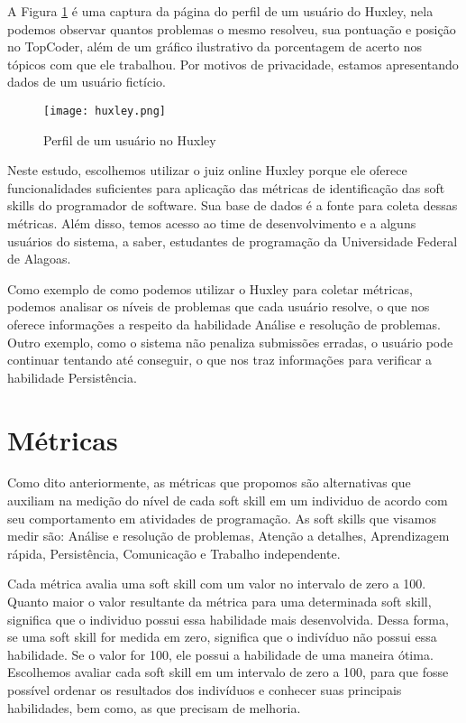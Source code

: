 A Figura \ref{fig:huxley} é uma captura da página do perfil de um usuário do Huxley, nela podemos observar quantos problemas o mesmo resolveu, sua pontuação e posição no TopCoder, além de um gráfico ilustrativo da porcentagem de acerto nos tópicos com que ele trabalhou.
Por motivos de privacidade, estamos apresentando dados de um usuário fictício.

\begin{figure}[ht]
\centering
\caption{\small Perfil de um usuário no Huxley} 
\texttt{[image: huxley.png]}
\label{fig:huxley}
\end{figure}

Neste estudo, escolhemos utilizar o juiz online Huxley porque ele oferece funcionalidades suficientes para aplicação das métricas de identificação das soft skills do programador de software. Sua base de dados é a fonte para coleta dessas métricas. Além disso, temos acesso ao time de desenvolvimento e a alguns usuários do sistema, a saber, estudantes de programação da Universidade Federal de Alagoas.

Como exemplo de como podemos utilizar o Huxley para coletar métricas, podemos analisar os níveis de problemas que cada usuário resolve, o que nos oferece informações a respeito da habilidade Análise e resolução de problemas. Outro exemplo, como o sistema não penaliza submissões erradas, o usuário pode continuar tentando até conseguir, o que nos traz informações para verificar a habilidade Persistência.

\section{Métricas} 
\label{sec:metrics}

Como dito anteriormente, as métricas que propomos são alternativas que auxiliam na medição do nível de cada soft skill em um individuo de acordo com seu comportamento em atividades de programação. As soft skills que visamos medir são: Análise e resolução de problemas, Atenção a detalhes, Aprendizagem rápida, Persistência, Comunicação e Trabalho independente.

Cada métrica avalia uma soft skill com um valor no intervalo de zero a 100. Quanto maior o valor resultante da métrica para uma determinada soft skill, significa que o individuo possui essa habilidade mais desenvolvida. Dessa forma, se uma soft skill for medida em zero, significa que o indivíduo não possui essa habilidade. Se o valor for 100, ele possui a habilidade de uma maneira ótima. Escolhemos avaliar cada soft skill em um intervalo de zero a 100, para que fosse possível ordenar os resultados dos indivíduos e conhecer suas principais habilidades, bem como, as que precisam de melhoria.

